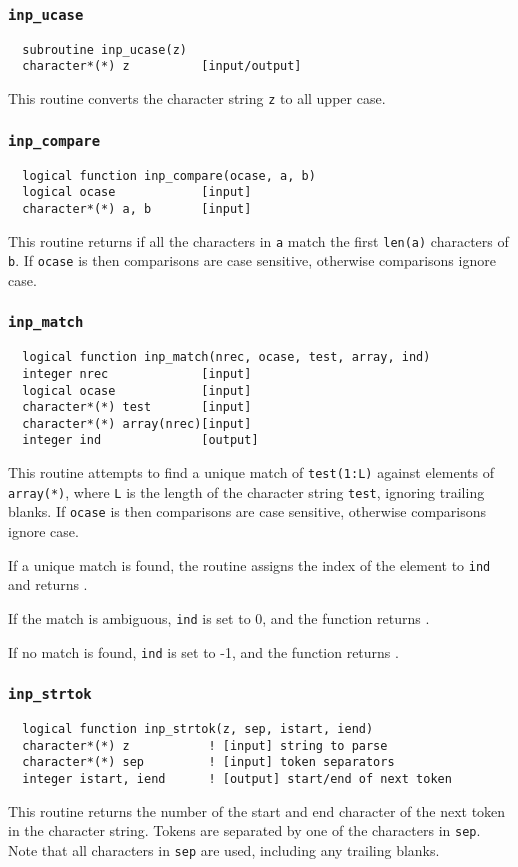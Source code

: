 \subsubsection{{\tt inp\_ucase}}
\begin{verbatim}
  subroutine inp_ucase(z)
  character*(*) z          [input/output]
\end{verbatim}
This routine converts the character string {\tt z} to all upper case.

\subsubsection{{\tt inp\_compare}}
\begin{verbatim}
  logical function inp_compare(ocase, a, b)
  logical ocase            [input]
  character*(*) a, b       [input]
\end{verbatim}
This routine returns \TRUE if all the characters in {\tt a} 
match the first {\tt len(a)}
characters of {\tt b}.  If {\tt ocase} is \TRUE then comparisons are case
sensitive, otherwise comparisons ignore case.

\subsubsection{{\tt inp\_match}}
\begin{verbatim}
  logical function inp_match(nrec, ocase, test, array, ind)
  integer nrec             [input]
  logical ocase            [input]
  character*(*) test       [input]
  character*(*) array(nrec)[input]
  integer ind              [output]
\end{verbatim}
This routine attempts to find a unique match of \verb+test(1:L)+
against elements of \verb+array(*)+, where
{\tt L} is the length of the character string {\tt test}, ignoring
trailing blanks.
If \verb+ocase+ is \TRUE then
comparisons are case sensitive, otherwise comparisons ignore case.

If a unique match is found, the routine assigns the index of the element to
\verb+ind+ and returns \TRUE.

If the match is ambiguous, \verb+ind+ is set to 0, and the function returns \FALSE.

If no match is found, \verb+ind+ is set to -1, and the function returns \FALSE.

\subsubsection{{\tt inp\_strtok}}
\begin{verbatim}
  logical function inp_strtok(z, sep, istart, iend)
  character*(*) z           ! [input] string to parse
  character*(*) sep         ! [input] token separators
  integer istart, iend      ! [output] start/end of next token
\end{verbatim}
This routine returns the number of the start and end character of the next token in
the character string.  Tokens are separated by one of the characters
in \verb+sep+.  Note that all characters in \verb+sep+ are used, including any
trailing blanks.

